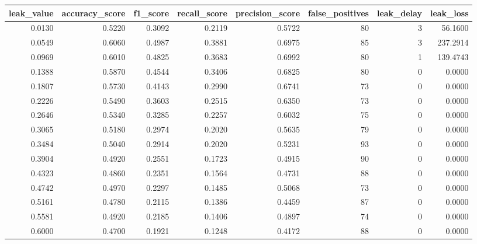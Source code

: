 \begin{tabular}{rrrrrrrr}
\toprule
leak\_value & accuracy\_score & f1\_score & recall\_score & precision\_score & false\_positives & leak\_delay & leak\_loss \\
\midrule
0.0130 & 0.5220 & 0.3092 & 0.2119 & 0.5722 & 80 & 3 & 56.1600 \\
0.0549 & 0.6060 & 0.4987 & 0.3881 & 0.6975 & 85 & 3 & 237.2914 \\
0.0969 & 0.6010 & 0.4825 & 0.3683 & 0.6992 & 80 & 1 & 139.4743 \\
0.1388 & 0.5870 & 0.4544 & 0.3406 & 0.6825 & 80 & 0 & 0.0000 \\
0.1807 & 0.5730 & 0.4143 & 0.2990 & 0.6741 & 73 & 0 & 0.0000 \\
0.2226 & 0.5490 & 0.3603 & 0.2515 & 0.6350 & 73 & 0 & 0.0000 \\
0.2646 & 0.5340 & 0.3285 & 0.2257 & 0.6032 & 75 & 0 & 0.0000 \\
0.3065 & 0.5180 & 0.2974 & 0.2020 & 0.5635 & 79 & 0 & 0.0000 \\
0.3484 & 0.5040 & 0.2914 & 0.2020 & 0.5231 & 93 & 0 & 0.0000 \\
0.3904 & 0.4920 & 0.2551 & 0.1723 & 0.4915 & 90 & 0 & 0.0000 \\
0.4323 & 0.4860 & 0.2351 & 0.1564 & 0.4731 & 88 & 0 & 0.0000 \\
0.4742 & 0.4970 & 0.2297 & 0.1485 & 0.5068 & 73 & 0 & 0.0000 \\
0.5161 & 0.4780 & 0.2115 & 0.1386 & 0.4459 & 87 & 0 & 0.0000 \\
0.5581 & 0.4920 & 0.2185 & 0.1406 & 0.4897 & 74 & 0 & 0.0000 \\
0.6000 & 0.4700 & 0.1921 & 0.1248 & 0.4172 & 88 & 0 & 0.0000 \\
\bottomrule
\end{tabular}
